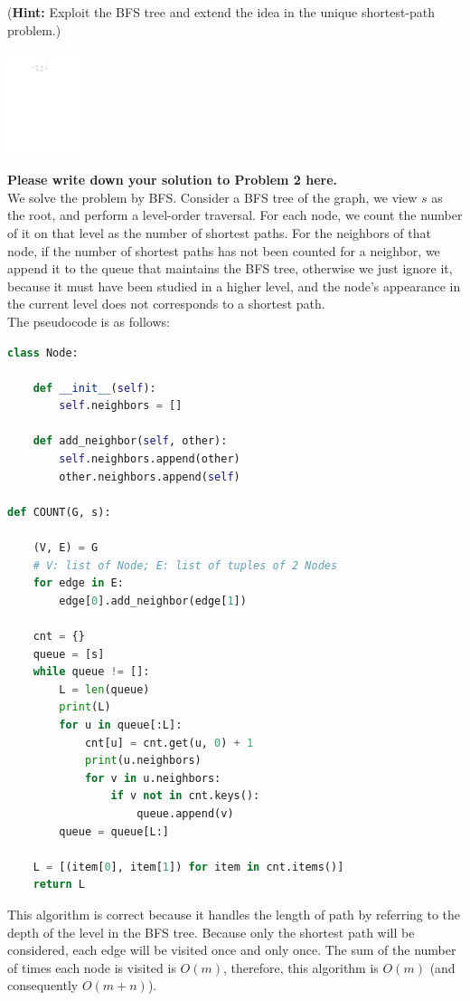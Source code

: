 \documentclass[11pt,twoside]{article}
\newenvironment{solution}{{\par\noindent\it Solution.}}{}
\begin{document}
(\textbf{Hint:} Exploit the BFS tree and extend the idea in the unique shortest-path problem.)

\begin{center}
    \includegraphics[height=3cm]{fig-graph.pdf}
\end{center}

\begin{solution}
\textbf{Please write down your solution to Problem 2 here.}
\vspace{10pt}\\
We solve the problem by BFS. Consider a BFS tree of the graph, we view $s$ as the root, 
and perform a level-order traversal. For each node, we count the number of it on that level as the number of shortest paths.
For the neighbors of that node, if the number of shortest paths has not been counted for a neighbor, 
we append it to the queue that maintains the BFS tree, otherwise we just ignore it, because it must have been studied in a higher level,
and the node's appearance in the current level does not corresponds to a shortest path.
\vspace{10pt}\\
The pseudocode is as follows:
\vspace{10pt}\\
\begin{lstlisting}[language=Python]
class Node:

    def __init__(self):
        self.neighbors = []

    def add_neighbor(self, other):
        self.neighbors.append(other)
        other.neighbors.append(self)

def COUNT(G, s):

    (V, E) = G 
    # V: list of Node; E: list of tuples of 2 Nodes
    for edge in E:
        edge[0].add_neighbor(edge[1])

    cnt = {}
    queue = [s]
    while queue != []:
        L = len(queue)
        print(L)
        for u in queue[:L]: 
            cnt[u] = cnt.get(u, 0) + 1
            print(u.neighbors)
            for v in u.neighbors:
                if v not in cnt.keys():
                    queue.append(v)
        queue = queue[L:]

    L = [(item[0], item[1]) for item in cnt.items()]
    return L
\end{lstlisting}
This algorithm is correct because it handles the length of path by referring to the depth of the level in the BFS tree.
Because only the shortest path will be considered, each edge will be visited once and only once.
The sum of the number of times each node is visited is $O(m)$, therefore, this algorithm is $O(m)$ (and consequently $O(m+n)$).
\end{solution}
\end{document}
